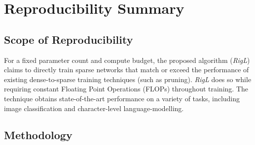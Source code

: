 \section*{\centering Reproducibility Summary}


\subsection*{Scope of Reproducibility}



For a fixed parameter count and compute budget, the proposed algorithm (\textit{RigL}) claims to directly train sparse networks that match or exceed the performance of existing dense-to-sparse training techniques (such as pruning). \textit{RigL} does so while requiring constant Floating Point Operations (FLOPs) throughout training. The technique obtains state-of-the-art performance on a variety of tasks, including image classification and character-level language-modelling.

\subsection*{Methodology}



